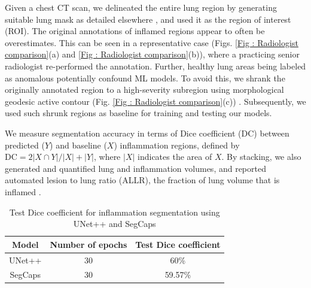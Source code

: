 Given a chest CT scan, we delineated the entire lung region by generating suitable lung mask as detailed elsewhere \cite{Sinha2022.01.30.22269998}, and used it as the region of interest (ROI). The original annotations of inflamed regions appear to often be overestimates. This can be seen in a representative case (Figs. \ref{Fig : Radiologist comparison}(a) and \ref{Fig : Radiologist comparison}(b)), where a practicing senior radiologist re-performed the annotation. Further, healthy lung areas being labeled as anomalous potentially confound ML models. To avoid this, we shrank the originally annotated region to a high-severity subregion using morphological geodesic active contour (Fig. \ref{Fig : Radiologist comparison}(c)) \cite{caselles1997geodesic}. Subsequently, we used such shrunk regions as baseline for training and testing our models. 

We measure segmentation accuracy in terms of Dice coefficient (DC) between predicted ($Y$) and baseline ($X$) inflammation regions, defined by $\mbox{DC} = {2|X\cap Y|}/{|X|+|Y|}$,
where $|X|$ indicates the area of $X$. By stacking, we also generated and quantified lung and inflammation volumes, and reported automated lesion to lung ratio (ALLR), the fraction of lung volume that is inflamed \cite{Sinha2022.01.30.22269998}.

\begin{table}[t!]
    \centering
    \caption{Test Dice coefficient for inflammation segmentation using UNet++ and SegCaps}
    \begin{tabular}{ccc}
    \toprule 
        \textbf{Model} & \textbf{Number of epochs} & \textbf{Test Dice coefficient} \\ 
    \midrule
        UNet++ & 30 &  60\% \\
       SegCaps & 30 &  59.57\% \\
       \bottomrule
    \end{tabular}
    \label{tab:2d-IS}
\end{table}


